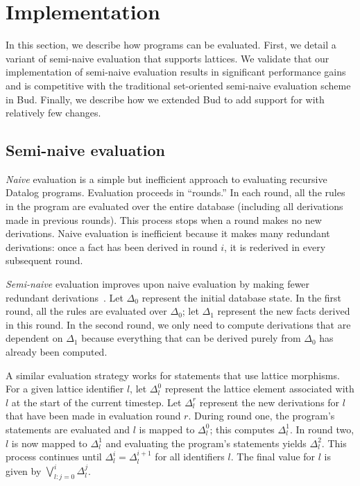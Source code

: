 \pagebreak
\section{Implementation}
\label{sec:impl}

In this section, we describe how \lang programs can be evaluated. First, we
detail a variant of semi-naive evaluation that supports lattices. We validate
that our implementation of semi-naive evaluation results in significant
performance gains and is competitive with the traditional set-oriented
semi-naive evaluation scheme in Bud. Finally, we describe how we extended Bud to
add support for \lang with relatively few changes.

\subsection{Semi-naive evaluation}
\label{sec:lattice-eval-strat}
\emph{Naive} evaluation is a simple but inefficient approach to evaluating
recursive Datalog programs. Evaluation proceeds in ``rounds.'' In each round, all
the rules in the program are evaluated over the entire database (including all
derivations made in previous rounds). This process stops when a round makes no
new derivations. Naive evaluation is inefficient because it makes many redundant
derivations: once a fact has been derived in round $i$, it is rederived in every
subsequent round.

\emph{Semi-naive} evaluation improves upon naive evaluation by making fewer
redundant derivations~\cite{Balbin1987}. Let $\Delta_0$ represent the initial
database state. In the first round, all the rules are evaluated over $\Delta_0$;
let $\Delta_1$ represent the new facts derived in this round. In the second
round, we only need to compute derivations that are dependent on $\Delta_1$
because everything that can be derived purely from $\Delta_0$ has already been
computed.

A similar evaluation strategy works for \lang statements that use lattice
morphisms. For a given lattice identifier $l$, let $\Delta_l^0$ represent the
lattice element associated with $l$ at the start of the current timestep. Let
$\Delta^r_l$ represent the new derivations for $l$ that have been made in
evaluation round $r$. During round one, the program's statements are evaluated
and $l$ is mapped to $\Delta_l^0$; this computes $\Delta^1_l$. In round two, $l$
is now mapped to $\Delta^1_l$ and evaluating the program's statements yields
$\Delta^2_l$. This process continues until $\Delta^i_l = \Delta^{i+1}_l$ for all
identifiers $l$.  The final value for $l$ is given by $\bigvee_{l: j=0}^i
\Delta^j_l$.

